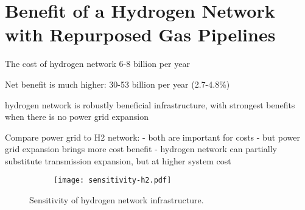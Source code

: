 \section*{Benefit of a Hydrogen Network with Repurposed Gas Pipelines}
\label{sec:h2}

The cost of hydrogen network 6-8 billion per year

Net benefit is much higher: 30-53 billion per year (2.7-4.8\%)

hydrogen network is robustly beneficial infrastructure, with strongest benefits when there is no power grid expansion

Compare power grid to H2 network:
- both are important for costs
- but power grid expansion brings more cost benefit
- hydrogen network can partially substitute transmission expansion, but at higher system cost

\begin{figure}
    \centering
    \begin{subfigure}[t]{\textwidth}
        \centering
        \texttt{[image: sensitivity-h2.pdf]}
    \end{subfigure}
    \caption{Sensitivity of hydrogen network infrastructure.}
    \label{fig:h2-restriction}
\end{figure}